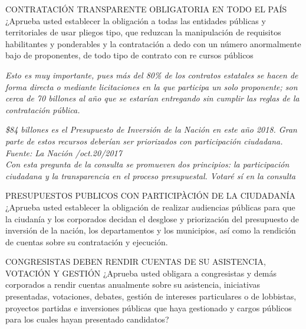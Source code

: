 \documentclass[twoside]{article}
\begin{document}
\begin{enumerate}
\begin{minipage}{0.6\linewidth}
  \end{minipage}
  \begin{minipage}{0.5\linewidth}
\item CONTRATACIÓN TRANSPARENTE OBLIGATORIA EN TODO EL PAÍS ¿Aprueba usted establecer la obligación a todas las entidades públicas y territoriales de usar pliegos tipo, que reduzcan la manipulación de requisitos habilitantes y ponderables y la contratación a dedo   con un número anormalmente bajo de proponentes, de todo tipo de contrato con re cursos públicos     
\end{minipage}\hfill
\begin{minipage}{0.45\linewidth}
  \begin{shaded}
\emph{  Esto es muy importante, pues más del 80\% de los contratos estatales se hacen de forma directa o mediante licitaciones en la que participa un solo proponente; son cerca de 70 billones al año que se estarían entregando sin cumplir las reglas de la contratación pública.}
\end{shaded}
\end{minipage}
\begin{minipage}{0.45\linewidth}
  \begin{shaded}
    \emph{ \$84 billones es el Presupuesto de Inversión de la Nación en este año 2018. Gran parte de estos recursos deberían ser priorizados con participación ciudadana. Fuente: La Nación /oct.20/2017\\
    Con esta pregunta de la consulta se promueven dos principios: la participación ciudadana y la transparencia en el proceso presupuestal. Votaré sí en la consulta }
  \end{shaded}
\end{minipage}\hfill
\begin{minipage}{0.5\linewidth}
\item PRESUPUESTOS PUBLICOS CON PARTICIPÀCIÓN DE LA CIUDADANÍA ¿Aprueba usted establecer la obligación de realizar audiencias públicas para que la ciudanía y los corporados decidan el desglose y priorización del presupuesto de inversión de la nación, los departamentos y los municipios, así como la rendición de cuentas  sobre su contratación y ejecución. 
\end{minipage}
\begin{minipage}{0.55\linewidth}
\item CONGRESISTAS DEBEN RENDIR CUENTAS DE SU ASISTENCIA, VOTACIÓN Y GESTIÓN ¿Aprueba usted obligara a congresistas y demás corporados a rendir cuentas anualmente sobre su asistencia, iniciativas presentadas, votaciones, debates, gestión de intereses particulares o de lobbistas, proyectos partidas e inversiones públicas que haya gestionado y cargos públicos para los cuales hayan presentado candidatos?

\end{minipage}
\end{enumerate}
\end{document}
